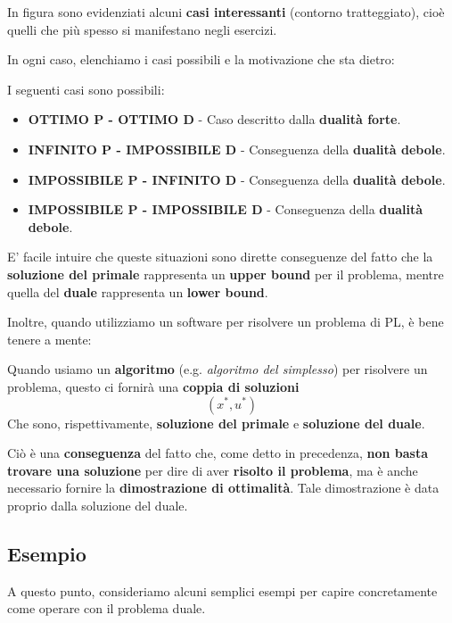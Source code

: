 In figura sono evidenziati alcuni \textbf{casi interessanti} (contorno tratteggiato), cioè 
quelli che più spesso si manifestano negli esercizi. 

In ogni caso, elenchiamo i casi possibili e la motivazione che sta dietro:

\begin{remark}
    I seguenti casi sono possibili:
    \begin{itemize}
        \item \textbf{OTTIMO P - OTTIMO D} - Caso descritto dalla \textbf{dualità forte}.
        \item \textbf{INFINITO P - IMPOSSIBILE D} - Conseguenza della \textbf{dualità debole}.
        \item \textbf{IMPOSSIBILE P - INFINITO D} - Conseguenza della \textbf{dualità debole}.
        \item \textbf{IMPOSSIBILE P - IMPOSSIBILE D} - Conseguenza della \textbf{dualità debole}.
    \end{itemize}
\end{remark}

E' facile intuire che queste situazioni sono dirette conseguenze del fatto che 
la \textbf{soluzione del primale} rappresenta un \textbf{upper bound} per il problema, 
mentre quella del \textbf{duale} rappresenta un \textbf{lower bound}.

Inoltre, quando utilizziamo un software per risolvere un problema di PL, è bene
tenere a mente:

\begin{remark}
    Quando usiamo un \textbf{algoritmo} (e.g. \textit{algoritmo del simplesso}) per
    risolvere un problema, questo ci fornirà una \textbf{coppia di soluzioni}
    \[
        (x^*, u^*)
    \] 
    Che sono, rispettivamente, \textbf{soluzione del primale} e \textbf{soluzione del duale}.
\end{remark}

Ciò è una \textbf{conseguenza} del fatto che, come detto in precedenza, 
\textbf{non basta trovare una soluzione} per dire di aver \textbf{risolto il problema}, 
ma è anche necessario fornire la \textbf{dimostrazione di ottimalità}. 
Tale dimostrazione è data proprio dalla soluzione del duale.

\subsection{Esempio}

A questo punto, consideriamo alcuni semplici esempi per capire concretamente 
come operare con il problema duale.

